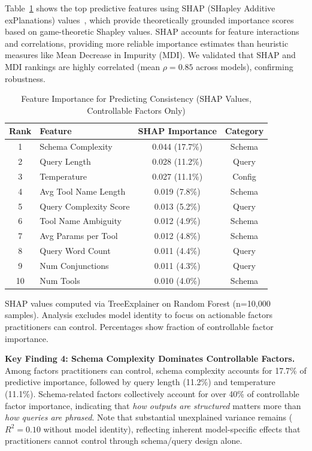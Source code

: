 \documentclass[sigconf,anonymous,review]{acmart}
\begin{document}
Table~\ref{tab:importance} shows the top predictive features using SHAP (SHapley Additive exPlanations) values~\cite{lundberg2017shap}, which provide theoretically grounded importance scores based on game-theoretic Shapley values. SHAP accounts for feature interactions and correlations, providing more reliable importance estimates than heuristic measures like Mean Decrease in Impurity (MDI). We validated that SHAP and MDI rankings are highly correlated (mean $\rho = 0.85$ across models), confirming robustness.

\begin{table}[t]
\centering
\caption{Feature Importance for Predicting Consistency (SHAP Values, Controllable Factors Only)}
\label{tab:importance}
\small
\begin{tabular}{@{}clcc@{}}
\toprule
\textbf{Rank} & \textbf{Feature} & \textbf{SHAP Importance} & \textbf{Category} \\
\midrule
1 & Schema Complexity & 0.044 (17.7\%) & Schema \\
2 & Query Length & 0.028 (11.2\%) & Query \\
3 & Temperature & 0.027 (11.1\%) & Config \\
4 & Avg Tool Name Length & 0.019 (7.8\%) & Schema \\
5 & Query Complexity Score & 0.013 (5.2\%) & Query \\
6 & Tool Name Ambiguity & 0.012 (4.9\%) & Schema \\
7 & Avg Params per Tool & 0.012 (4.8\%) & Schema \\
8 & Query Word Count & 0.011 (4.4\%) & Query \\
9 & Num Conjunctions & 0.011 (4.3\%) & Query \\
10 & Num Tools & 0.010 (4.0\%) & Schema \\
\bottomrule
\end{tabular}
\vspace{0.3em}

\raggedright\footnotesize SHAP values computed via TreeExplainer on Random Forest (n=10,000 samples). Analysis excludes model identity to focus on actionable factors practitioners can control. Percentages show fraction of controllable factor importance.
\end{table}

\textbf{Key Finding 4: Schema Complexity Dominates Controllable Factors.} Among factors practitioners can control, schema complexity accounts for 17.7\% of predictive importance, followed by query length (11.2\%) and temperature (11.1\%). Schema-related factors collectively account for over 40\% of controllable factor importance, indicating that \textit{how outputs are structured} matters more than \textit{how queries are phrased}. Note that substantial unexplained variance remains ($R^2 = 0.10$ without model identity), reflecting inherent model-specific effects that practitioners cannot control through schema/query design alone.
\end{document}
